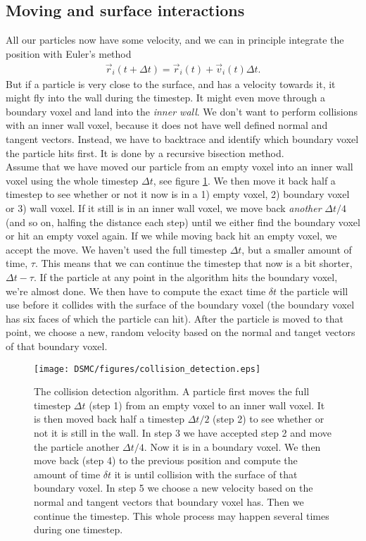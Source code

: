 \subsection{Moving and surface interactions}
All our particles now have some velocity, and we can in principle integrate the position with Euler's method
\begin{align}
	\vec r_i(t + \Delta t) = \vec r_i(t) + \vec v_i(t)\Delta t.
\end{align}
But if a particle is very close to the surface, and has a velocity towards it, it might fly into the wall during the timestep. It might even move through a boundary voxel and land into the \textit{inner wall}. We don't want to perform collisions with an inner wall voxel, because it does not have well defined normal and tangent vectors. Instead, we have to backtrace and identify which boundary voxel the particle hits first. It is done by a recursive bisection method.\\
Assume that we have moved our particle from an empty voxel into an inner wall voxel using the whole timestep $\Delta t$, see figure \ref{fig:dsmc_collision_detection}. We then move it back half a timestep to see whether or not it now is in a 1) empty voxel, 2) boundary voxel or 3) wall voxel. If it still is in an inner wall voxel, we move back \textit{another} $\Delta t/4$ (and so on, halfing the distance each step) until we either find the boundary voxel or hit an empty voxel again. If we while moving back hit an empty voxel, we accept the move. We haven't used the full timestep $\Delta t$, but a smaller amount of time, $\tau$. This means that we can continue the timestep that now is a bit shorter, $\Delta t - \tau$. If the particle at any point in the algorithm hits the boundary voxel, we're almost done. We then have to compute the exact time $\delta t$ the particle will use before it collides with the surface of the boundary voxel (the boundary voxel has six faces of which the particle can hit). After the particle is moved to that point, we choose a new, random velocity based on the normal and tanget vectors of that boundary voxel.\\
\begin{figure}[h]
\begin{center}
\texttt{[image: DSMC/figures/collision\_detection.eps]}
\end{center}
\caption{The collision detection algorithm. A particle first moves the full timestep $\Delta t$ (step 1) from an empty voxel to an inner wall voxel. It is then moved back half a timestep  $\Delta t/2$ (step 2) to see whether or not it is still in the wall. In step 3 we have accepted step 2 and move the particle another $\Delta t/4$. Now it is in a boundary voxel. We then move back (step 4) to the previous position and compute the amount of time $\delta t$ it is until collision with the surface of that boundary voxel. In step 5 we choose a new velocity based on the normal and tangent vectors that boundary voxel has. Then we continue the timestep. This whole process may happen several times during one timestep.}
\label{fig:dsmc_collision_detection}
\end{figure}
